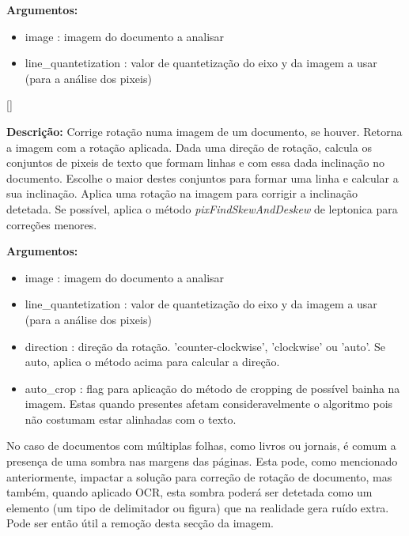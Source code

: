 \textbf{Argumentos:}
\begin{itemize}\setlength\itemsep{-0.3em}
	\item image : imagem do documento a analisar
	\item line\_quantetization : valor de quantetização do eixo y da imagem a usar (para a análise dos pixeis) 
\end{itemize}

[\normalsize]

\textbf{Descrição:} Corrige rotação numa imagem de um documento, se houver. Retorna a imagem com a rotação aplicada. Dada uma direção de rotação, calcula os conjuntos de pixeis de texto que formam linhas e com essa dada inclinação no documento. Escolhe o maior destes conjuntos para formar uma linha e calcular a sua inclinação. Aplica uma rotação na imagem para corrigir a inclinação detetada. 
Se possível, aplica o método \textit{pixFindSkewAndDeskew} de leptonica para correções menores.

\textbf{Argumentos:}
\begin{itemize}\setlength\itemsep{-0.3em}
	\item image : imagem do documento a analisar
	\item line\_quantetization : valor de quantetização do eixo y da imagem a usar (para a análise dos pixeis) 
	\item direction : direção da rotação. 'counter-clockwise', 'clockwise' ou 'auto'. Se auto, aplica o método acima para calcular a direção.
	\item auto\_crop : flag para aplicação do método de cropping de possível bainha na imagem. Estas quando presentes afetam consideravelmente o algoritmo pois não costumam estar alinhadas com o texto.
\end{itemize}

\label{contribution_image_cut_argin_shadow}

No caso de documentos com múltiplas folhas, como livros ou jornais, é comum a presença de uma sombra nas margens das páginas. Esta pode, como mencionado anteriormente, impactar a solução para correção de rotação de documento, mas também, quando aplicado OCR, esta sombra poderá ser detetada como um elemento (um tipo de delimitador ou figura) que na realidade gera ruído extra. Pode ser então útil a remoção desta secção da imagem.


